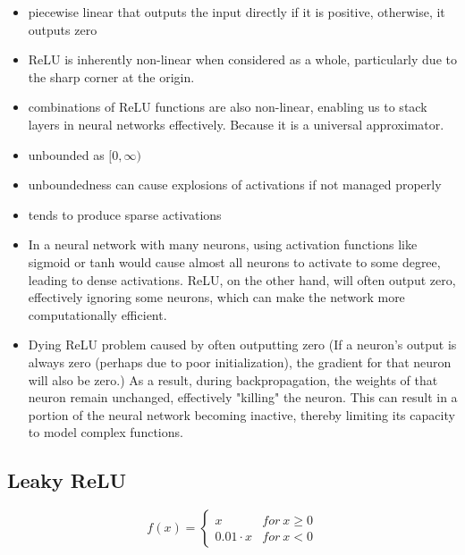 \documentclass[11pt]{article}
\begin{document}
\begin{itemize}
    \item piecewise linear that outputs the input directly if it is positive, otherwise, it outputs zero
    \item ReLU is inherently non-linear when considered as a whole, particularly due to the sharp corner at the origin.
    \item combinations of ReLU functions are also non-linear, enabling us to stack layers in neural networks effectively. Because it is a universal approximator.
    \item unbounded as $[0,\infty)$
    \item unboundedness can cause explosions of activations if not managed properly
    \item tends to produce sparse activations
    \item In a neural network with many neurons, using activation functions like sigmoid or tanh would cause almost all neurons to activate to some degree, leading to dense activations. ReLU, on the other hand, will often output zero, effectively ignoring some neurons, which can make the network more computationally efficient.
    \item Dying ReLU problem caused by often outputting zero (If a neuron's output is always zero (perhaps due to poor initialization), the gradient for that neuron will also be zero.) As a result, during backpropagation, the weights of that neuron remain unchanged, effectively "killing" the neuron. This can result in a portion of the neural network becoming inactive, thereby limiting its capacity to model complex functions.
\end{itemize}

\subsection{Leaky ReLU}

\begin{definition}\label{eq:activation-leaky-relu}
    \begin{equation*}
        f(x) = \begin{cases}
            x & for \ x \geq 0 \\ 
            0.01 \cdot x & for \ x < 0
        \end{cases}
    \end{equation*}
\end{definition}
\end{document}

